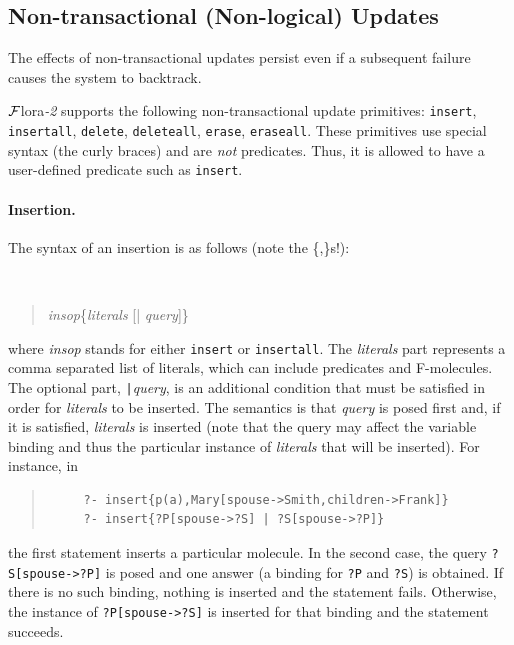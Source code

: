 \documentclass[11pt]{article}
\newcommand{\FLORA}{{\mbox{\sc ${\cal F}${lora}\rm\emph{-2}}}\xspace}
\begin{document}
\subsection{Non-transactional (Non-logical) Updates}
\label{sec:non-transactional-updates}

%
The effects of non-transactional updates persist even if a subsequent failure
causes the system to backtrack.

\FLORA supports the following non-transactional update primitives:
{\tt insert}, {\tt insertall}, {\tt delete}, {\tt deleteall},
{\tt erase}, {\tt eraseall}. These primitives use special syntax (the curly
braces) and are \emph{not} predicates. Thus, it is allowed to have a
user-defined predicate such as {\tt insert}.

%
\paragraph{Insertion.} The syntax of an insertion is as follows (note the
\{,\}s!):
{\tt
\begin{quote}
\emph{insop}\{\emph{literals} [| \emph{query}]\}
\end{quote}
}
\noindent
where {\it insop} stands for either {\tt insert} or {\tt insertall}.
The
{\it literals} part represents a comma separated list of literals,
which can include
predicates and \mbox{F-molecules}. The optional part, {\tt |}{\it query},
is an additional condition that must be satisfied in order for
\emph{literals} to be inserted.
The semantics is that \emph{query} is posed first and, if it is
satisfied, \emph{literals} is inserted (note that the query may affect the
variable binding and thus the particular instance of \emph{literals} that
will be inserted). For instance, in
\begin{quote}
\begin{verbatim}
     ?- insert{p(a),Mary[spouse->Smith,children->Frank]}
     ?- insert{?P[spouse->?S] | ?S[spouse->?P]}
\end{verbatim}
\end{quote}
the first statement inserts a particular molecule. In the second case, the
query {\tt ?S[spouse->?P]} is posed and one answer (a binding for {\tt ?P} and
{\tt ?S}) is obtained. If there is no such binding, nothing is inserted and
the statement fails. Otherwise, the instance of {\tt ?P[spouse->?S]} is
inserted for that binding and the statement succeeds.
\end{document}

